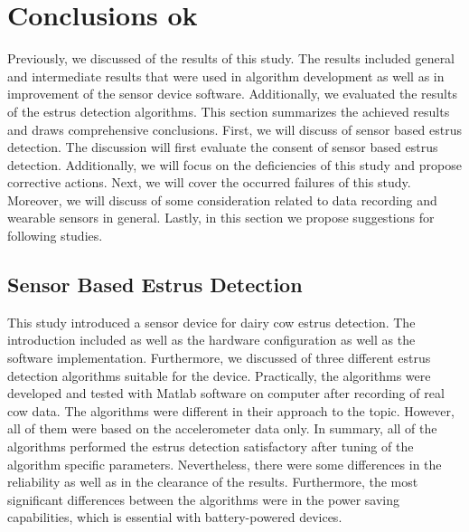 \documentclass[english,12pt,a4paper,pdftex,elec,utf8]{aaltothesis}
\begin{document}
\section{Conclusions ok} \label{conclusionssection}

Previously, we discussed of the results of this study. The results included general and intermediate results that were used in algorithm development as well as in improvement of the sensor device software. Additionally, we evaluated the results of the estrus detection algorithms. This section summarizes the achieved results and draws comprehensive conclusions. First, we will discuss of sensor based estrus detection. The discussion will first evaluate the consent of sensor based estrus detection. Additionally, we will focus on the deficiencies of this study and propose corrective actions. Next, we will cover the occurred failures of this study. Moreover, we will discuss of some consideration related to data recording and wearable sensors in general. Lastly, in this section we propose suggestions for following studies.

\subsection{Sensor Based Estrus Detection}

This study introduced a sensor device for dairy cow estrus detection. The introduction included as well as the hardware configuration as well as the software implementation. Furthermore, we discussed of three different estrus detection algorithms suitable for the device. Practically, the algorithms were developed and tested with Matlab software on computer after recording of real cow data. The algorithms were different in their approach to the topic. However, all of them were based on the accelerometer data only. In summary, all of the algorithms performed the estrus detection satisfactory after tuning of the algorithm specific parameters. Nevertheless, there were some differences in the reliability as well as in the clearance of the results. Furthermore, the most significant differences between the algorithms were in the power saving capabilities, which is essential with battery-powered devices.
\end{document}
